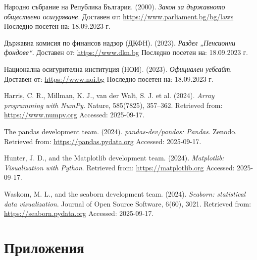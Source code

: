 \documentclass[a4paper,12pt]{article}
\begin{document}
\begin{thebibliography}{99}
        Народно събрание на Република България. (2000).
        \newblock \emph{Закон за държавното обществено осигуряване}.
        \newblock Доставен от: \url{https://www.parliament.bg/bg/laws}
        \newblock Последно посетен на: 18.09.2023 г.

        Държавна комисия по финансов надзор (ДКФН). (2023).
        \newblock \emph{Раздел „Пенсионни фондове“}.
        \newblock Доставен от: \url{https://www.dkn.bg}
        \newblock Последно посетен на: 18.09.2023 г.

        Национална осигурителна институция (НОИ). (2023).
        \newblock \emph{Официален уебсайт}.
        \newblock Доставен от: \url{https://www.noi.bg}
        \newblock Последно посетен на: 18.09.2023 г.

        Harris, C. R., Millman, K. J., van der Walt, S. J. et al. (2024).
        \newblock \emph{Array programming with NumPy}.
        \newblock Nature, 585(7825), 357–362.
        \newblock Retrieved from: \url{https://www.numpy.org}
        \newblock Accessed: 2025-09-17.

        The pandas development team. (2024).
        \newblock \emph{pandas-dev/pandas: Pandas}.
        \newblock Zenodo.
        \newblock Retrieved from: \url{https://pandas.pydata.org}
        \newblock Accessed: 2025-09-17.

        Hunter, J. D., and the Matplotlib development team. (2024).
        \newblock \emph{Matplotlib: Visualization with Python}.
        \newblock Retrieved from: \url{https://matplotlib.org}
        \newblock Accessed: 2025-09-17.

        Waskom, M. L., and the seaborn development team. (2024).
        \newblock \emph{Seaborn: statistical data visualization}.
        \newblock Journal of Open Source Software, 6(60), 3021.
        \newblock Retrieved from: \url{https://seaborn.pydata.org}
        \newblock Accessed: 2025-09-17.
\end{thebibliography}
\newpage
\section{Приложения}





\end{document}

